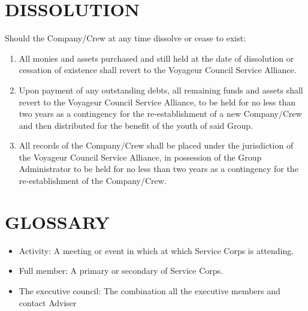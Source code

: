 \documentclass{Service_Corps_Document}
\begin{document}
    \section{DISSOLUTION}
    Should the Company/Crew at any time dissolve or cease to exist:
    \begin{enumerate}
        \item All monies and assets purchased and still held at the date of dissolution or cessation of existence shall revert to the Voyageur Council Service Alliance.
        \item Upon payment of any outstanding debts, all remaining funds and assets shall revert to the Voyageur Council Service Alliance, to be held for no less than two years as a contingency for the re-establishment of a new Company/Crew and then distributed for the benefit of the youth of said Group.
        \item All records of the Company/Crew shall be placed under the jurisdiction of the Voyageur Council Service Alliance, in possession of the Group Administrator to be held for no less than two years as a contingency for the re-establishment of the Company/Crew.
    \end{enumerate}


    \section{GLOSSARY}
    \begin{itemize}
        \item Activity: A meeting or event in which at which Service Corps is attending.
        \item Full member: A primary or secondary of Service Corps.
        \item The executive council: The combination all the executive members and contact Adviser
    \end{itemize}
\end{document}

